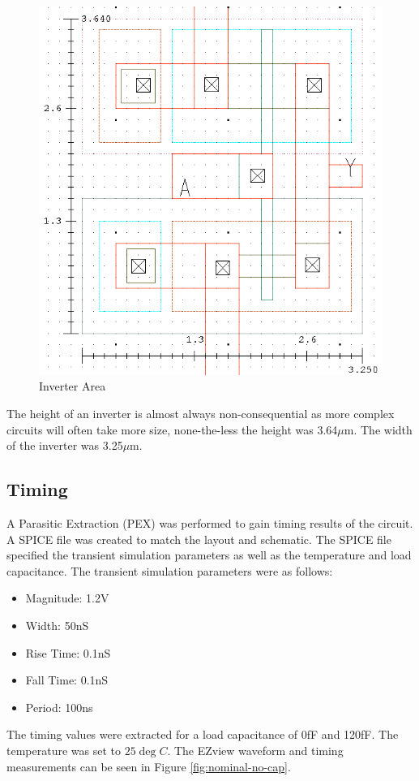 \documentclass[11pt]{article}
\begin{document}
		\begin{figure}[H]
			\centering
			\includegraphics[width=0.7\linewidth]{"Pictures/Inverter Area"}
			\caption{Inverter Area}
			\label{fig:area}
		\end{figure}
		
		The height of an inverter is almost always non-consequential as more complex circuits will often take more size, none-the-less the height was 3.64$\mu$m. The width of the inverter was 3.25$\mu$m.
	
	\subsection{Timing}
	
		A Parasitic Extraction (PEX) was performed to gain timing results of the circuit. A SPICE file was created to match the layout and schematic. The SPICE file specified the transient simulation parameters as well as the temperature and load capacitance. The transient simulation parameters were as follows:		
		\begin{itemize}
			\item Magnitude: 1.2V
			\item Width: 50nS
			\item Rise Time: 0.1nS
			\item Fall Time: 0.1nS
			\item Period: 100ns
		\end{itemize}
	
		The timing values were extracted for a load capacitance of 0fF and 120fF. The temperature was set to $25\deg C$. The EZview waveform and timing measurements can be seen in Figure \ref{fig:nominal-no-cap}.
		
\end{document}
